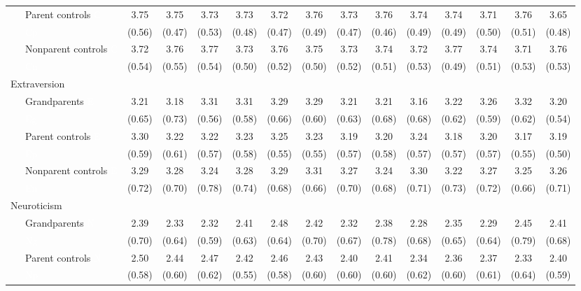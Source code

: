 \documentclass[
  english,
  man, noextraspace,floatsintext]{apa7}
\newenvironment{lltable}{\begin{landscape}\begin{center}\begin{ThreePartTable}}{\end{ThreePartTable}\end{center}\end{landscape}}
\begin{document}
\begin{appendix}
\begin{lltable}
{\begin{longtable}{lccccccccccccc}
\ \ \ Parent controls \textcolor{white}{C} & 3.75 & 3.75 & 3.73 & 3.73 & 3.72 & 3.76 & 3.73 & 3.76 & 3.74 & 3.74 & 3.71 & 3.76 & 3.65\\
\ \ \ \textcolor{white}{Cp} & (0.56) & (0.47) & (0.53) & (0.48) & (0.47) & (0.49) & (0.47) & (0.46) & (0.49) & (0.49) & (0.50) & (0.51) & (0.48)\\
\ \ \ Nonparent controls \textcolor{white}{C} & 3.72 & 3.76 & 3.77 & 3.73 & 3.76 & 3.75 & 3.73 & 3.74 & 3.72 & 3.77 & 3.74 & 3.71 & 3.76\\
\ \ \ \textcolor{white}{Cn} & (0.54) & (0.55) & (0.54) & (0.50) & (0.52) & (0.50) & (0.52) & (0.51) & (0.53) & (0.49) & (0.51) & (0.53) & (0.53)\\
Extraversion &  &  &  &  &  &  &  &  &  &  &  &  & \\
\ \ \ Grandparents \textcolor{white}{E} & 3.21 & 3.18 & 3.31 & 3.31 & 3.29 & 3.29 & 3.21 & 3.21 & 3.16 & 3.22 & 3.26 & 3.32 & 3.20\\
\ \ \ \textcolor{white}{Eg} & (0.65) & (0.73) & (0.56) & (0.58) & (0.66) & (0.60) & (0.63) & (0.68) & (0.68) & (0.62) & (0.59) & (0.62) & (0.54)\\
\ \ \ Parent controls \textcolor{white}{E} & 3.30 & 3.22 & 3.22 & 3.23 & 3.25 & 3.23 & 3.19 & 3.20 & 3.24 & 3.18 & 3.20 & 3.17 & 3.19\\
\ \ \ \textcolor{white}{Ep} & (0.59) & (0.61) & (0.57) & (0.58) & (0.55) & (0.55) & (0.57) & (0.58) & (0.57) & (0.57) & (0.57) & (0.55) & (0.50)\\
\ \ \ Nonparent controls \textcolor{white}{E} & 3.29 & 3.28 & 3.24 & 3.28 & 3.29 & 3.31 & 3.27 & 3.24 & 3.30 & 3.22 & 3.27 & 3.25 & 3.26\\
\ \ \ \textcolor{white}{En} & (0.72) & (0.70) & (0.78) & (0.74) & (0.68) & (0.66) & (0.70) & (0.68) & (0.71) & (0.73) & (0.72) & (0.66) & (0.71)\\
Neuroticism &  &  &  &  &  &  &  &  &  &  &  &  & \\
\ \ \ Grandparents \textcolor{white}{N} & 2.39 & 2.33 & 2.32 & 2.41 & 2.48 & 2.42 & 2.32 & 2.38 & 2.28 & 2.35 & 2.29 & 2.45 & 2.41\\
\ \ \ \textcolor{white}{Ng} & (0.70) & (0.64) & (0.59) & (0.63) & (0.64) & (0.70) & (0.67) & (0.78) & (0.68) & (0.65) & (0.64) & (0.79) & (0.68)\\
\ \ \ Parent controls \textcolor{white}{N} & 2.50 & 2.44 & 2.47 & 2.42 & 2.46 & 2.43 & 2.40 & 2.41 & 2.34 & 2.36 & 2.37 & 2.33 & 2.40\\
\ \ \ \textcolor{white}{Np} & (0.58) & (0.60) & (0.62) & (0.55) & (0.58) & (0.60) & (0.60) & (0.60) & (0.62) & (0.60) & (0.61) & (0.64) & (0.59)\\

\end{longtable}}
\end{lltable}
\end{appendix}
\end{document}
